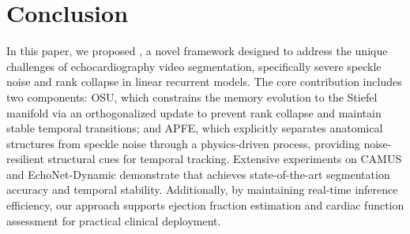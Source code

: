 \section{Conclusion}

\noindent
In this paper, we proposed \mymodel, a novel framework designed to address the unique challenges of echocardiography video segmentation, specifically severe speckle noise and rank collapse in linear recurrent models. 
The core contribution includes two components: OSU, which constrains the memory evolution to the Stiefel manifold via an orthogonalized update to prevent rank collapse and maintain stable temporal transitions; and APFE, which explicitly separates anatomical structures from speckle noise through a physics-driven process, providing noise-resilient structural cues for temporal tracking.
Extensive experiments on CAMUS and EchoNet-Dynamic demonstrate that \mymodel achieves state-of-the-art segmentation accuracy and temporal stability.
Additionally, by maintaining real-time inference efficiency, our approach supports ejection fraction estimation and cardiac function assessment for practical clinical deployment.